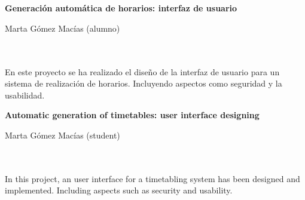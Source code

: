 \chapter*{}
\thispagestyle{empty}
\cleardoublepage

\thispagestyle{empty}

% 



\cleardoublepage
\thispagestyle{empty}

\begin{center}
{\large\bfseries Generación automática de horarios: interfaz de usuario}\\
\end{center}
\begin{center}
Marta Gómez Macías (alumno)\\
\end{center}

\\

\vspace{0.7cm}
\\

En este proyecto se ha realizado el diseño de la interfaz de usuario para un sistema de realización de horarios. Incluyendo aspectos como seguridad y la usabilidad.
\cleardoublepage


\thispagestyle{empty}


\begin{center}
{\large\bfseries Automatic generation of timetables: user interface designing}\\
\end{center}
\begin{center}
Marta Gómez Macías (student)\\
\end{center}

\\

\vspace{0.7cm}
\\

In this project, an user interface for a timetabling system has been designed and implemented. Including aspects such as security and usability.

